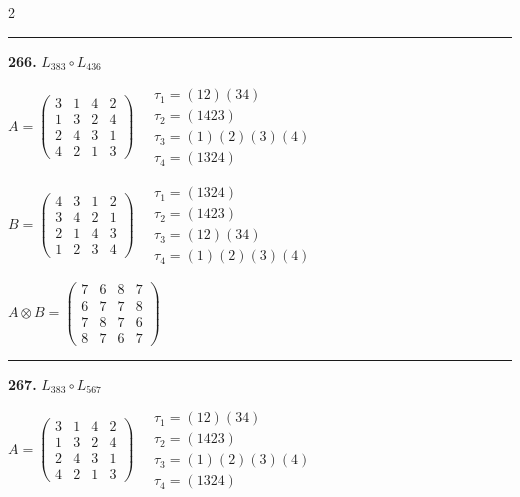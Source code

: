 \begin{multicols}{2}
\vspace{0.3em}
\hrule
\vspace{0.3em}

\noindent\textbf{266.} $L_{383} \circ L_{436}$

$A = \begin{pmatrix} 3 & 1 & 4 & 2 \\ 1 & 3 & 2 & 4 \\ 2 & 4 & 3 & 1 \\ 4 & 2 & 1 & 3 \end{pmatrix} \quad \begin{matrix} \tau_{1}=(1 2)(3 4) \\ \tau_{2}=(1 4 2 3) \\ \tau_{3}=(1)(2)(3)(4) \\ \tau_{4}=(1 3 2 4) \end{matrix}$

$B = \begin{pmatrix} 4 & 3 & 1 & 2 \\ 3 & 4 & 2 & 1 \\ 2 & 1 & 4 & 3 \\ 1 & 2 & 3 & 4 \end{pmatrix} \quad \begin{matrix} \tau_{1}=(1 3 2 4) \\ \tau_{2}=(1 4 2 3) \\ \tau_{3}=(1 2)(3 4) \\ \tau_{4}=(1)(2)(3)(4) \end{matrix}$

$A \otimes B = \begin{pmatrix} 7 & 6 & 8 & 7 \\ 6 & 7 & 7 & 8 \\ 7 & 8 & 7 & 6 \\ 8 & 7 & 6 & 7 \end{pmatrix}$

\vspace{0.3em}
\hrule
\vspace{0.3em}

\noindent\textbf{267.} $L_{383} \circ L_{567}$

$A = \begin{pmatrix} 3 & 1 & 4 & 2 \\ 1 & 3 & 2 & 4 \\ 2 & 4 & 3 & 1 \\ 4 & 2 & 1 & 3 \end{pmatrix} \quad \begin{matrix} \tau_{1}=(1 2)(3 4) \\ \tau_{2}=(1 4 2 3) \\ \tau_{3}=(1)(2)(3)(4) \\ \tau_{4}=(1 3 2 4) \end{matrix}$


\end{multicols}
